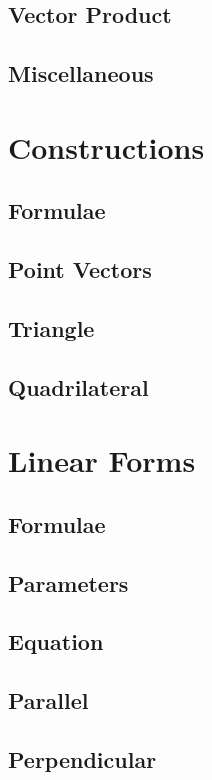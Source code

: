 \documentclass[journal]{IEEEtran}
\begin{document}
\subsection{Vector Product}

\subsection{Miscellaneous}

\newpage
\section{Constructions}
\subsection{Formulae}

\subsection{Point Vectors}

\subsection{Triangle}

\subsection{Quadrilateral}

\newpage
\section{Linear Forms}
\subsection{Formulae}

\subsection{Parameters}

\subsection{Equation }

\subsection{Parallel}

\subsection{Perpendicular}

\end{document}

